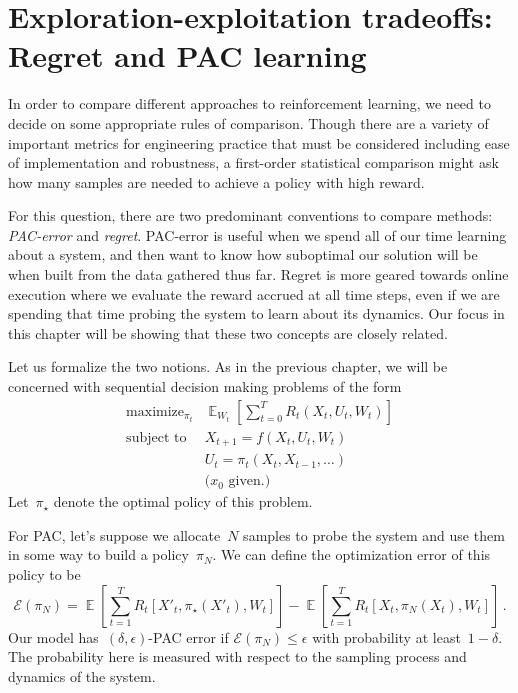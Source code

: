 \documentclass{tufte-book}
\begin{document}
\hypertarget{exploration-exploitation-tradeoffs-regret-and-pac-learning}{%
\section{Exploration-exploitation tradeoffs: Regret and PAC
learning}\label{exploration-exploitation-tradeoffs-regret-and-pac-learning}}

In order to compare different approaches to reinforcement learning, we
need to decide on some appropriate rules of comparison. Though there are
a variety of important metrics for engineering practice that must be
considered including ease of implementation and robustness, a
first-order statistical comparison might ask how many samples are needed
to achieve a policy with high reward.

For this question, there are two predominant conventions to compare
methods: \emph{PAC-error} and \emph{regret}. PAC-error is
useful when we spend all of our time learning about a system, and then
want to know how suboptimal our solution will be when built from the
data gathered thus far. Regret is more geared towards online execution
where we evaluate the reward accrued at all time steps, even if we are
spending that time probing the system to learn about its dynamics. Our
focus in this chapter will be showing that these two concepts are
closely
related.

Let us formalize the two notions. As in the previous chapter, we will be
concerned with sequential decision making problems of the form \[
\begin{array}{ll}
\text{maximize}_{\pi_t} & \mathop\mathbb{E}_{W_t}\left[ \sum_{t=0}^T R_t(X_t,U_t,W_t) \right]\\
\text{subject to} & X_{t+1} = f(X_t, U_t, W_t) \\
& U_t = \pi_t(X_t, X_{t-1},\ldots)\\
& \text{($x_0$ given.)}
\end{array}
\] Let~\(\pi_\star\) denote the optimal policy of this problem.

For PAC, let's suppose we allocate~\(N\) samples to probe the system and
use them in some way to build a policy~\(\pi_N\). We can define the
optimization error of this policy to be \[
    \mathcal{E}(\pi_N)=\mathop\mathbb{E}\left[\sum_{t=1}^T R_t[X'_t,\pi_\star(X'_t),W_t]\right]-\mathop\mathbb{E}\left[\sum_{t=1}^T R_t[X_t,\pi_N(X_t),W_t]\right]\,.
\] Our model has~\((\delta,\epsilon)\)-PAC error if
\(\mathcal{E}(\pi_N)\leq \epsilon\) with probability at
least~\(1-\delta\). The probability here is measured with respect to the
sampling process and dynamics of the system.
\end{document}
